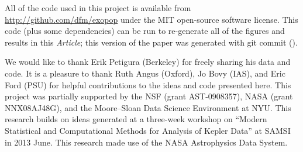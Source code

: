 \documentclass[12pt,preprint]{aastex}
\newcommand{\project}[1]{{\sffamily #1}}
\newcommand{\paper}{\textsl{Article}}
\begin{document}
All of the code used in this project is available from
\url{http://github.com/dfm/exopop} under the MIT open-source software license.
This code (plus some dependencies) can be run to re-generate all of the
figures and results in this \paper; this version of the paper was generated
with git commit \texttt{\githash} (\gitdate).

\acknowledgments
We would like to thank Erik Petigura (Berkeley) for freely sharing his data
and code.
It is a pleasure to thank
Ruth Angus (Oxford),
Jo Bovy (IAS), and
Eric Ford (PSU)
for helpful contributions to the ideas and code presented here.
This project was partially supported by the NSF (grant AST-0908357), NASA
(grant NNX08AJ48G), and the Moore--Sloan Data Science Environment at NYU.
This research builds on ideas generated at a three-week workshop on ``Modern
Statistical and Computational Methods for Analysis of Kepler Data'' at SAMSI
in 2013 June.
This research made use of the NASA \project{Astrophysics Data System}.
\end{document}
